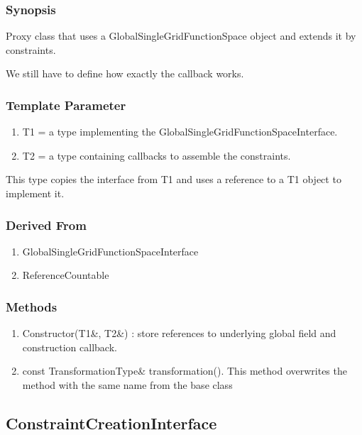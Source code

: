 \documentclass[11pt,a4paper,DIV11,%
notitlepage,oneside,abstracton,%
bibtotoc]{scrartcl}
\begin{document}
\subsubsection{Synopsis}

Proxy class that uses a GlobalSingleGridFunctionSpace object and extends it by
constraints. 

We still have to define how exactly the callback works.

\subsubsection{Template Parameter}

\begin{enumerate}[1)]
\item T1 = a type implementing the GlobalSingleGridFunctionSpaceInterface.
\item T2 = a type containing callbacks to assemble the constraints.
\end{enumerate}

This type copies the interface from T1 and uses a reference to a T1
object to implement it. 

\subsubsection{Derived From}

\begin{enumerate}[1)]
\item GlobalSingleGridFunctionSpaceInterface
\item ReferenceCountable
\end{enumerate}


\subsubsection{Methods}

\begin{enumerate}[1)]
\item Constructor(T1\&, T2\&) : store references to underlying global
  field and construction callback.
\item const TransformationType\& transformation(). This method
  overwrites the method with the same name from the base class
\end{enumerate}


\subsection{ConstraintCreationInterface}
\end{document}
